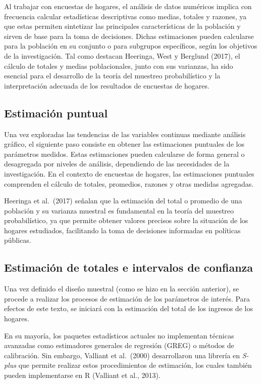 \documentclass[
  12pt,
]{book}
\begin{document}
Al trabajar con encuestas de hogares, el análisis de datos numéricos implica con frecuencia calcular estadísticas descriptivas como medias, totales y razones, ya que estas permiten sintetizar las principales características de la población y sirven de base para la toma de decisiones. Dichas estimaciones pueden calcularse para la población en su conjunto o para subgrupos específicos, según los objetivos de la investigación. Tal como destacan Heeringa, West y Berglund (2017), el cálculo de totales y medias poblacionales, junto con sus varianzas, ha sido esencial para el desarrollo de la teoría del muestreo probabilístico y la interpretación adecuada de los resultados de encuestas de hogares.

\subsection{Estimación puntual}\label{estimaciuxf3n-puntual}

Una vez exploradas las tendencias de las variables continuas mediante análisis gráfico, el siguiente paso consiste en obtener las estimaciones puntuales de los parámetros medidos. Estas estimaciones pueden calcularse de forma general o desagregada por niveles de análisis, dependiendo de las necesidades de la investigación. En el contexto de encuestas de hogares, las estimaciones puntuales comprenden el cálculo de totales, promedios, razones y otras medidas agregadas.

Heeringa et al.~(2017) señalan que la estimación del total o promedio de una población y su varianza muestral es fundamental en la teoría del muestreo probabilístico, ya que permite obtener valores precisos sobre la situación de los hogares estudiados, facilitando la toma de decisiones informadas en políticas públicas.

\subsection{Estimación de totales e intervalos de confianza}\label{estimaciuxf3n-de-totales-e-intervalos-de-confianza}

Una vez definido el diseño muestral (como se hizo en la sección anterior), se procede a realizar los procesos de estimación de los parámetros de interés. Para efectos de este texto, se iniciará con la estimación del total de los ingresos de los hogares.

En su mayoría, los paquetes estadísticos actuales no implementan técnicas avanzadas como estimadores generales de regresión (GREG) o métodos de calibración. Sin embargo, Valliant et al.~(2000) desarrollaron una librería en \emph{S-plus} que permite realizar estos procedimientos de estimación, los cuales también pueden implementarse en R (Valliant et al., 2013).
\end{document}
